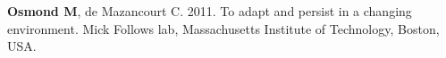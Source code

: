 \documentclass[12pt]{article}
\begin{document}

\textbf{Osmond M}, de Mazancourt C. 2011. To adapt and persist in a changing environment. Mick Follows lab, Massachusetts Institute of Technology, Boston, USA.

%
%
%
%
%
%
%
%
%
%
%
\end{document}
